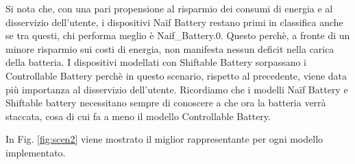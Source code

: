 \documentclass[italian, Lau, oneside]{sapthesis}
\begin{document}
Si nota che, con una pari propensione al risparmio dei consumi di energia e al disservizio dell'utente, i dispositivi Naïf Battery restano primi in classifica anche se tra questi, chi performa meglio è Naif\_Battery.0. Questo perchè, a fronte di un minore risparmio sui costi di energia, non manifesta nessun deficit nella carica della batteria. I dispositivi modellati con Shiftable Battery sorpassano i Controllable Battery perchè in questo scenario, rispetto al precedente, viene data più importanza al disservizio dell'utente. Ricordiamo che i modelli Naïf Battery e Shiftable battery necessitano sempre di conoscere a che ora la batteria verrà staccata, cosa di cui fa a meno il modello Controllable Battery.


In Fig. \ref{fig:scen2} viene mostrato il miglior rappresentante per ogni modello implementato.
\end{document}
